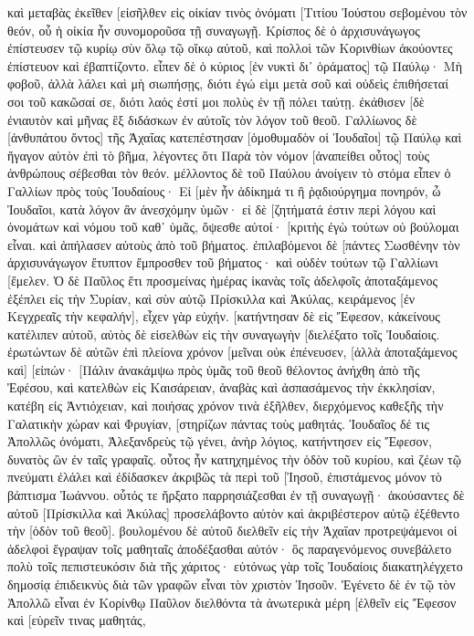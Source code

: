 καὶ μεταβὰς ἐκεῖθεν [εἰσῆλθεν εἰς οἰκίαν τινὸς ὀνόματι [Τιτίου Ἰούστου σεβομένου τὸν θεόν, οὗ ἡ οἰκία ἦν συνομοροῦσα τῇ συναγωγῇ. 
Κρίσπος δὲ ὁ ἀρχισυνάγωγος ἐπίστευσεν τῷ κυρίῳ σὺν ὅλῳ τῷ οἴκῳ αὐτοῦ, καὶ πολλοὶ τῶν Κορινθίων ἀκούοντες ἐπίστευον καὶ ἐβαπτίζοντο. 
εἶπεν δὲ ὁ κύριος [ἐν νυκτὶ δι᾽ ὁράματος] τῷ Παύλῳ· Μὴ φοβοῦ, ἀλλὰ λάλει καὶ μὴ σιωπήσῃς, 
διότι ἐγώ εἰμι μετὰ σοῦ καὶ οὐδεὶς ἐπιθήσεταί σοι τοῦ κακῶσαί σε, διότι λαός ἐστί μοι πολὺς ἐν τῇ πόλει ταύτῃ. 
ἐκάθισεν [δὲ ἐνιαυτὸν καὶ μῆνας ἓξ διδάσκων ἐν αὐτοῖς τὸν λόγον τοῦ θεοῦ. 
Γαλλίωνος δὲ [ἀνθυπάτου ὄντος] τῆς Ἀχαΐας κατεπέστησαν [ὁμοθυμαδὸν οἱ Ἰουδαῖοι] τῷ Παύλῳ καὶ ἤγαγον αὐτὸν ἐπὶ τὸ βῆμα, 
λέγοντες ὅτι Παρὰ τὸν νόμον [ἀναπείθει οὗτος] τοὺς ἀνθρώπους σέβεσθαι τὸν θεόν. 
μέλλοντος δὲ τοῦ Παύλου ἀνοίγειν τὸ στόμα εἶπεν ὁ Γαλλίων πρὸς τοὺς Ἰουδαίους· Εἰ [μὲν ἦν ἀδίκημά τι ἢ ῥᾳδιούργημα πονηρόν, ὦ Ἰουδαῖοι, κατὰ λόγον ἂν ἀνεσχόμην ὑμῶν· 
εἰ δὲ [ζητήματά ἐστιν περὶ λόγου καὶ ὀνομάτων καὶ νόμου τοῦ καθ᾽ ὑμᾶς, ὄψεσθε αὐτοί· [κριτὴς ἐγὼ τούτων οὐ βούλομαι εἶναι. 
καὶ ἀπήλασεν αὐτοὺς ἀπὸ τοῦ βήματος. 
ἐπιλαβόμενοι δὲ [πάντες Σωσθένην τὸν ἀρχισυνάγωγον ἔτυπτον ἔμπροσθεν τοῦ βήματος· καὶ οὐδὲν τούτων τῷ Γαλλίωνι [ἔμελεν. 
Ὁ δὲ Παῦλος ἔτι προσμείνας ἡμέρας ἱκανὰς τοῖς ἀδελφοῖς ἀποταξάμενος ἐξέπλει εἰς τὴν Συρίαν, καὶ σὺν αὐτῷ Πρίσκιλλα καὶ Ἀκύλας, κειράμενος [ἐν Κεγχρεαῖς τὴν κεφαλήν], εἶχεν γὰρ εὐχήν. 
[κατήντησαν δὲ εἰς Ἔφεσον, κἀκείνους κατέλιπεν αὐτοῦ, αὐτὸς δὲ εἰσελθὼν εἰς τὴν συναγωγὴν [διελέξατο τοῖς Ἰουδαίοις. 
ἐρωτώντων δὲ αὐτῶν ἐπὶ πλείονα χρόνον [μεῖναι οὐκ ἐπένευσεν, 
[ἀλλὰ ἀποταξάμενος καὶ] [εἰπών· [Πάλιν ἀνακάμψω πρὸς ὑμᾶς τοῦ θεοῦ θέλοντος ἀνήχθη ἀπὸ τῆς Ἐφέσου, 
καὶ κατελθὼν εἰς Καισάρειαν, ἀναβὰς καὶ ἀσπασάμενος τὴν ἐκκλησίαν, κατέβη εἰς Ἀντιόχειαν, 
καὶ ποιήσας χρόνον τινὰ ἐξῆλθεν, διερχόμενος καθεξῆς τὴν Γαλατικὴν χώραν καὶ Φρυγίαν, [στηρίζων πάντας τοὺς μαθητάς. 
Ἰουδαῖος δέ τις Ἀπολλῶς ὀνόματι, Ἀλεξανδρεὺς τῷ γένει, ἀνὴρ λόγιος, κατήντησεν εἰς Ἔφεσον, δυνατὸς ὢν ἐν ταῖς γραφαῖς. 
οὗτος ἦν κατηχημένος τὴν ὁδὸν τοῦ κυρίου, καὶ ζέων τῷ πνεύματι ἐλάλει καὶ ἐδίδασκεν ἀκριβῶς τὰ περὶ τοῦ [Ἰησοῦ, ἐπιστάμενος μόνον τὸ βάπτισμα Ἰωάννου. 
οὗτός τε ἤρξατο παρρησιάζεσθαι ἐν τῇ συναγωγῇ· ἀκούσαντες δὲ αὐτοῦ [Πρίσκιλλα καὶ Ἀκύλας] προσελάβοντο αὐτὸν καὶ ἀκριβέστερον αὐτῷ ἐξέθεντο τὴν [ὁδὸν τοῦ θεοῦ]. 
βουλομένου δὲ αὐτοῦ διελθεῖν εἰς τὴν Ἀχαΐαν προτρεψάμενοι οἱ ἀδελφοὶ ἔγραψαν τοῖς μαθηταῖς ἀποδέξασθαι αὐτόν· ὃς παραγενόμενος συνεβάλετο πολὺ τοῖς πεπιστευκόσιν διὰ τῆς χάριτος· 
εὐτόνως γὰρ τοῖς Ἰουδαίοις διακατηλέγχετο δημοσίᾳ ἐπιδεικνὺς διὰ τῶν γραφῶν εἶναι τὸν χριστὸν Ἰησοῦν. 
Ἐγένετο δὲ ἐν τῷ τὸν Ἀπολλῶ εἶναι ἐν Κορίνθῳ Παῦλον διελθόντα τὰ ἀνωτερικὰ μέρη [ἐλθεῖν εἰς Ἔφεσον καὶ [εὑρεῖν τινας μαθητάς, 
